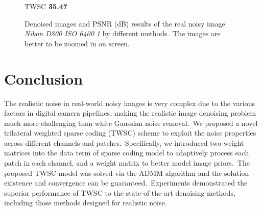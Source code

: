 \begin{figure}[t!]
{\begin{minipage}[t]{0.19\textwidth}
{\footnotesize TWSC \textbf{35.47}}
\end{minipage}
}\vspace{-3mm}
    \caption{Denoised images and PSNR (dB) results of the real noisy image \textsl{Nikon D800 ISO 6400 1} \cite{crosschannel2016} by different methods.\ The images are better to be zoomed in on screen.}
    \label{fig5-15}
\end{figure}



\section{Conclusion}

The realistic noise in real-world noisy images is very complex due to the various factors in digital camera pipelines, making the realistic image denoising problem much more challenging than white Gaussian noise removal.\ We proposed a novel trilateral weighted sparse coding (TWSC) scheme to exploit the noise properties across different channels and patches.\ Specifically, we introduced two weight matrices into the data term of sparse coding model to adaptively process each patch in each channel, and a weight matrix to better model image priors.\ The proposed TWSC model was solved via the ADMM algorithm and the solution existence and convergence can be guaranteed.\ Experiments demonstrated the superior performance of TWSC to the state-of-the-art denoising methods, including those methods designed for realistic noise.